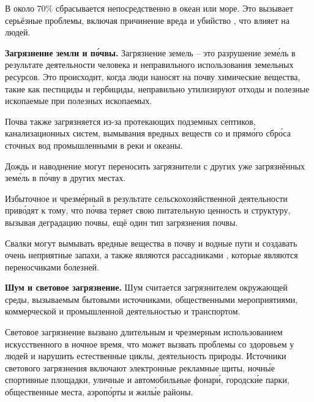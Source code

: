 В  около 70\%  сбрасывается непосредственно в океан или море. Это вызывает серьёзные проблемы, включая причинение вреда и убийство , что  влияет на людей.

\textbf{Загрязнение земли и п\'{о}чвы.}
Загрязнение земель -- это разрушение зем\'{е}ль в результате деятельности человека и неправильного использования земельных ресурсов. Это происходит, когда люди наносят на почву химические вещества, такие как пестициды и гербициды, неправильно утилизируют отходы и   полезные ископаемые при  полезных ископаемых.

Почва также загрязняется из-за протекающих подземных септиков, канализационных систем, вымывания вредных веществ со  и прям\'{о}го сбр\'{о}са сточных вод промышленными  в реки и океаны.

Дождь и наводнение могут переносить загрязнители с других уже загрязнённых зем\'{е}ль в п\'{о}чву в других местах.

Избыточное  и чрезм\'{е}рный  в результате сельскохозяйственной деятельности прив\'{о}дят к тому, что п\'{о}чва теряет свою питательную ценность и структуру, вызывая деградацию почвы, ещё один тип загрязнения почвы.

Свалки могут вымывать вредные вещества в почву и водные пути и создавать очень неприятные запахи, а также являются рассадниками , которые являются переносчиками болезней.

\textbf{Шум и световое загрязнение.}
Шум считается загрязнителем окружающей среды, вызываемым бытовыми источниками, общественными мероприятиями, коммерческой и промышленной деятельностью и транспортом.

Световое загрязнение вызвано длительным и чрезмерным использованием искусственного  в ночное время, что может вызвать проблемы со здоровьем у людей и нарушить естественные циклы,  деятельность  природы. Источники светового загрязнения включают электронные рекламные щиты, ночн\'{ы}е спортивные площадки, уличные и автомобильные фонар\'{и}, городск\'{и}е парки, общественные места, аэроп\'{о}рты и жил\'{ы}е районы.


